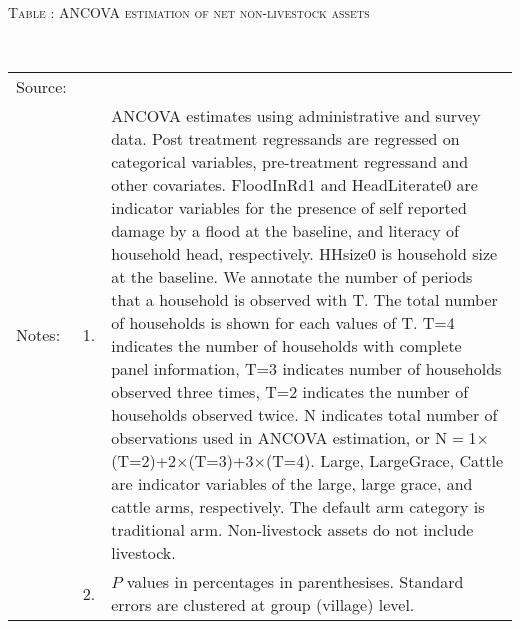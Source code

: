 




\hspace{-1cm}\begin{minipage}[t]{14cm}
\hfil\textsc{\normalsize Table \thetable: ANCOVA estimation of net non-livestock assets\label{tab ANCOVA NetNLAssets}}\\
\setlength{\tabcolsep}{1pt}
\setlength{\baselineskip}{8pt}
\renewcommand{\arraystretch}{.55}
\hfil{}\\
\renewcommand{\arraystretch}{.8}
\setlength{\tabcolsep}{1pt}
\begin{tabular}{>{\hfill\scriptsize}p{1cm}<{}>{\hfill\scriptsize}p{.25cm}<{}>{\scriptsize}p{12cm}<{\hfill}}
Source:& \multicolumn{2}{l}{\scriptsize Estimated with GUK administrative and survey data.}\\
Notes: & 1. & ANCOVA estimates using administrative and survey data. Post treatment regressands are regressed on categorical variables, pre-treatment regressand and other covariates. \textsf{FloodInRd1} and \textsf{HeadLiterate0} are indicator variables for the presence of self reported damage by a flood at the baseline, and literacy of household head, respectively. \textsf{HHsize0} is household size at the baseline. We annotate the number of periods that a household is observed with \textsf{T}. The total number of households is shown for each values of \textsf{T}. \textsf{T=4} indicates the number of households with complete panel information, \textsf{T=3} indicates number of households observed three times, \textsf{T=2} indicates the number of households observed twice. \textsf{N} indicates total number of observations used in ANCOVA estimation, or \textsf{N$=$1$\times$(T=2)+2$\times$(T=3)+3$\times$(T=4)}.  \textsf{Large}, \textsf{LargeGrace}, \textsf{Cattle} are indicator variables of the \textsf{large}, \textsf{large grace}, and \textsf{cattle} arms, respectively. The default arm category is \textsf{traditional} arm. Non-livestock assets do not include livestock. \\
& 2. & $P$ values in percentages in parenthesises. Standard errors are clustered at group (village) level.
\end{tabular}
\end{minipage}

